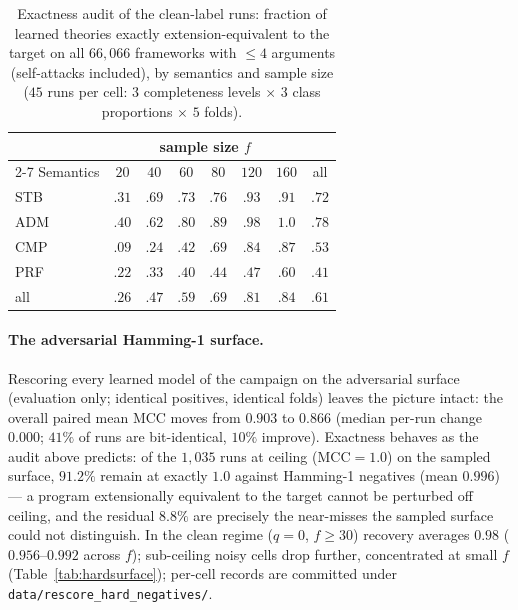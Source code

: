 \documentclass[review,12pt]{elsarticle}
\theoremstyle{definition}
\theoremstyle{remark}
\begin{document}
\begin{table}[t]
\centering
\small
\caption{Exactness audit of the clean-label runs: fraction of learned
theories exactly extension-equivalent to the target on all $66{,}066$
frameworks with $\le 4$ arguments (self-attacks included), by semantics and
sample size ($45$ runs per cell: $3$ completeness levels $\times$ $3$ class
proportions $\times$ $5$ folds).}
\label{tab:exactness}
\begin{tabular}{lccccccc}
\toprule
& \multicolumn{6}{c}{sample size $f$} & \\
\cmidrule(lr){2-7}
Semantics & $20$ & $40$ & $60$ & $80$ & $120$ & $160$ & all \\
\midrule
STB & $.31$ & $.69$ & $.73$ & $.76$ & $.93$ & $.91$ & $.72$ \\
ADM & $.40$ & $.62$ & $.80$ & $.89$ & $.98$ & $1.0$ & $.78$ \\
CMP & $.09$ & $.24$ & $.42$ & $.69$ & $.84$ & $.87$ & $.53$ \\
PRF & $.22$ & $.33$ & $.40$ & $.44$ & $.47$ & $.60$ & $.41$ \\
\midrule
all & $.26$ & $.47$ & $.59$ & $.69$ & $.81$ & $.84$ & $.61$ \\
\bottomrule
\end{tabular}
\end{table}

\paragraph{The adversarial Hamming-1 surface.} Rescoring every learned model
of the campaign on the adversarial surface (evaluation only; identical
positives, identical folds) leaves the picture intact: the overall paired
mean MCC moves from $0.903$ to $0.866$ (median per-run change $0.000$;
$41\%$ of runs are bit-identical, $10\%$ improve). Exactness behaves as the
audit above predicts: of the $1{,}035$ runs at ceiling ($\text{MCC}=1.0$) on
the sampled surface, $91.2\%$ remain at exactly $1.0$ against Hamming-1
negatives (mean $0.996$) --- a program extensionally equivalent to the target
cannot be perturbed off ceiling, and the residual $8.8\%$ are precisely the
near-misses the sampled surface could not distinguish. In the clean regime
($q{=}0$, $f\ge30$) recovery averages $0.98$ ($0.956$--$0.992$ across $f$);
sub-ceiling noisy cells drop
further, concentrated at small $f$ (Table~\ref{tab:hardsurface}); per-cell
records are committed under \texttt{data/rescore\_hard\_negatives/}.
\end{document}
